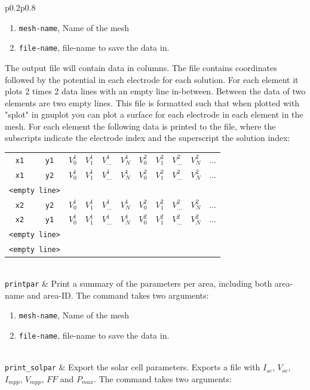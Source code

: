 \documentclass[noshowpacs,preprintnumbers,amsmath,amssymb, letter]{revtex4}
\begin{document}
\begin{longtable}{p{}p{}}
\begin{enumerate}
\item \texttt{mesh-name}, Name of the mesh
\item \texttt{file-name}, file-name to save the data in.
\end{enumerate}
The output file will contain data in columns. The file contains coordinates followed by the potential in each electrode for each solution. For each element it plots 2 times 2 data lines with an empty line in-between. Between the data of two elements are two empty lines. This file is formatted such that when plotted with "splot" in gnuplot you can plot a surface for each electrode in each element in the mesh. For each element the following data is printed to the file, where the subscripts indicate the electrode index and the superscript the solution index:\newline 
\begin{tabular}{ccccccccccc}
	\texttt{x1} & \texttt{y1} & $V_0^1$ & $V_1^1$ & $V_{...}^1$ & $V_N^1$ & $V_0^2$ & $V_1^2$ & $V_{...}^2$ & $V_N^2$& ...\\
	\texttt{x1} & \texttt{y2} & $V_0^1$ & $V_1^1$ & $V_{...}^1$ & $V_N^1$ & $V_0^2$ & $V_1^2$ & $V_{...}^2$ & $V_N^2$& ...\\
	\multicolumn{2}{l}{\texttt{<empty line>}}\\
	\texttt{x2} & \texttt{y2} & $V_0^1$ & $V_1^1$ & $V_{...}^1$ & $V_N^1$ & $V_0^2$ & $V_1^2$ & $V_{...}^2$ & $V_N^2$& ...\\
	\texttt{x2} & \texttt{y1} & $V_0^1$ & $V_1^1$ & $V_{...}^1$ & $V_N^1$ & $V_0^2$ & $V_1^2$ & $V_{...}^2$ & $V_N^2$& ...\\
	\multicolumn{2}{l}{\texttt{<empty line>}}\\
	\multicolumn{2}{l}{\texttt{<empty line>}}\\
\end{tabular}\\
\texttt{printpar}	& Print a summary of the parameters per area, including both area-name and area-ID. The command takes two arguments:
\begin{enumerate}
\item \texttt{mesh-name}, Name of the mesh
\item \texttt{file-name}, file-name to save the data in.
\end{enumerate}\\
\texttt{print\_solpar}		& Export the solar cell parameters. Exports a file with $I_{sc}$, $V_{oc}$, $I_{mpp}$, $V_{mpp}$, $FF$ and $P_{max}$. The command takes two arguments:

\end{longtable}
\end{document}
